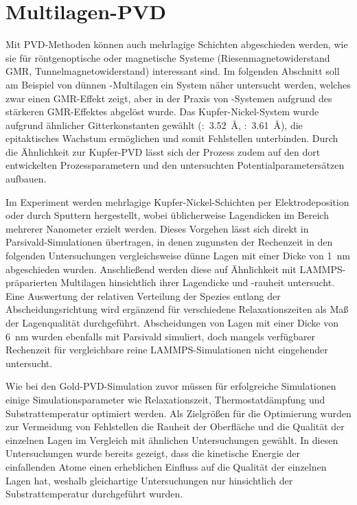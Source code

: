 \section{Multilagen-PVD}
\label{multilayer}


Mit PVD-Methoden können auch mehrlagige Schichten abgeschieden werden, wie sie für röntgenoptische oder magnetische Systeme (Riesenmagnetowiderstand GMR, Tunnelmagnetowiderstand) interessant sind.
Im folgenden Abschnitt soll am Beispiel von dünnen -Multilagen ein System näher untersucht werden, welches zwar einen GMR-Effekt zeigt, aber in der Praxis von -Systemen aufgrund des stärkeren GMR-Effektes abgelöst wurde\cite{bird_giant_1995}.
Das Kupfer-Nickel-System wurde aufgrund ähnlicher Gitterkonstanten gewählt (:~\SI{3.52}{\angstrom}, :~\SI{3.61}{\angstrom}), die epitaktisches Wachstum ermöglichen und somit Fehlstellen unterbinden.
Durch die Ähnlichkeit zur Kupfer-PVD lässt sich der Prozess zudem auf den dort entwickelten Prozessparametern und den untersuchten Potentialparametersätzen aufbauen.

Im Experiment werden mehrlagige Kupfer-Nickel-Schichten per Elektro\-deposition\cite{yang_pulsed_1995} oder durch Sputtern\cite{cammarata_nanoindentation_1990} hergestellt, wobei üblicherweise Lagendicken im Bereich mehrerer Nanometer erzielt werden.
Dieses Vorgehen lässt sich direkt in Parsivald-Simulationen übertragen, in denen zugunsten der Rechenzeit in den folgenden Untersuchungen vergleichsweise dünne Lagen mit einer Dicke von \SI{1}{\nano\meter} abgeschieden wurden.
Anschließend werden diese auf Ähnlichkeit mit LAMMPS-präparierten Multilagen hinsichtlich ihrer Lagendicke und -rauheit untersucht.
Eine Auswertung der relativen Verteilung der Spezies entlang der Abscheidungsrichtung wird ergänzend für verschiedene Relaxationszeiten als Maß der Lagenqualität durchgeführt.
Abscheidungen von Lagen mit einer Dicke von \SI{6}{\nano\meter} wurden ebenfalls mit Parsivald simuliert, doch mangels verfügbarer Rechenzeit für vergleichbare reine LAMMPS-Simulationen nicht eingehender untersucht.

Wie bei den Gold-PVD-Simulation zuvor müssen für erfolgreiche Simulationen einige Simulationsparameter wie Relaxationszeit, Thermostatdämpfung und Substrattemperatur optimiert werden.
Als Zielgrößen für die Optimierung wurden zur Vermeidung von Fehlstellen die Rauheit der Oberfläche und die Qualität der einzelnen Lagen im Vergleich mit ähnlichen Untersuchungen\cite{zhou_atomistic_1998} gewählt.
In diesen Untersuchungen wurde bereits gezeigt, dass die kinetische Energie der einfallenden Atome einen erheblichen Einfluss auf die Qualität der einzelnen Lagen hat, weshalb gleichartige Untersuchungen nur hinsichtlich der Substrattemperatur durchgeführt wurden.

